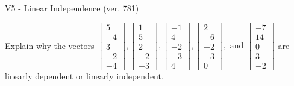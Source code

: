 \begin{exercise}
  \begin{exerciseTitle}V5 - Linear Independence (ver. 781)\end{exerciseTitle}
  \begin{exerciseStatement}
    Explain why the vectors \(\left[\begin{array}{r}
5 \\
-4 \\
3 \\
-2 \\
-4
\end{array}\right] , \left[\begin{array}{r}
1 \\
5 \\
2 \\
-2 \\
-3
\end{array}\right] , \left[\begin{array}{r}
-1 \\
4 \\
-2 \\
-3 \\
4
\end{array}\right] , \left[\begin{array}{r}
2 \\
-6 \\
-2 \\
-3 \\
0
\end{array}\right] , \text{ and } \left[\begin{array}{r}
-7 \\
14 \\
0 \\
3 \\
-2
\end{array}\right]\) are linearly dependent or linearly independent.	



\end{exerciseStatement}
\end{exercise}

